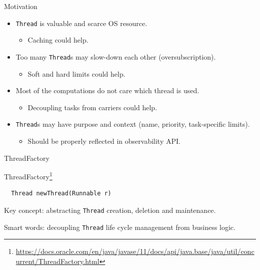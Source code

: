 \begin{frame}{Motivation}

\begin{itemize}
    \item \texttt{Thread} is valuable and scarce OS resource. 
    \begin{itemize} \item Caching could help. \end{itemize}
    \item Too many \texttt{Thread}s may slow-down each other (oversubscription). 
    \begin{itemize} \item Soft and hard limits could help. \end{itemize}
    \item Most of the computations do not care which thread is used. 
    \begin{itemize} \item Decoupling tasks from carriers could help. \end{itemize}
    \item \texttt{Thread}s may have purpose and context (name, priority, task-specific limits).
    \begin{itemize} \item  Should be properly reflected in observability API. \end{itemize}
\end{itemize}

\end{frame}


\begin{frame}[fragile]{ThreadFactory}

ThreadFactory\footnote{\tiny\url{https://docs.oracle.com/en/java/javase/11/docs/api/java.base/java/util/concurrent/ThreadFactory.html}}

\begin{verbatim}
  Thread newThread(Runnable r)
\end{verbatim}

Key concept: abstracting \texttt{Thread} creation, deletion and maintenance.

Smart words: decoupling \texttt{Thread} life cycle management from business logic.

\end{frame}


